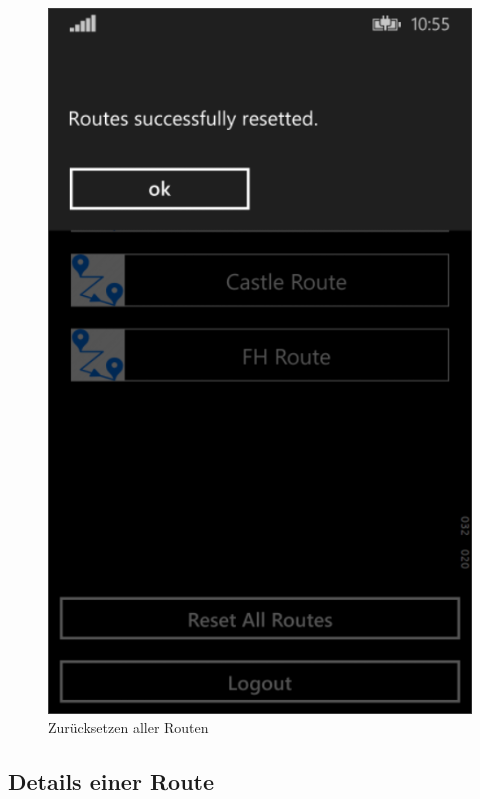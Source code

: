 \documentclass[a4paper,ngerman]{scrartcl}
\begin{document}
\begin{figure}[h]
\centering
\includegraphics[width=.95\textwidth]{images/routePage_ResetRoutes}
\caption{Zurücksetzen aller Routen}
\end{figure}

\subsection{Details einer Route}
\end{document}
